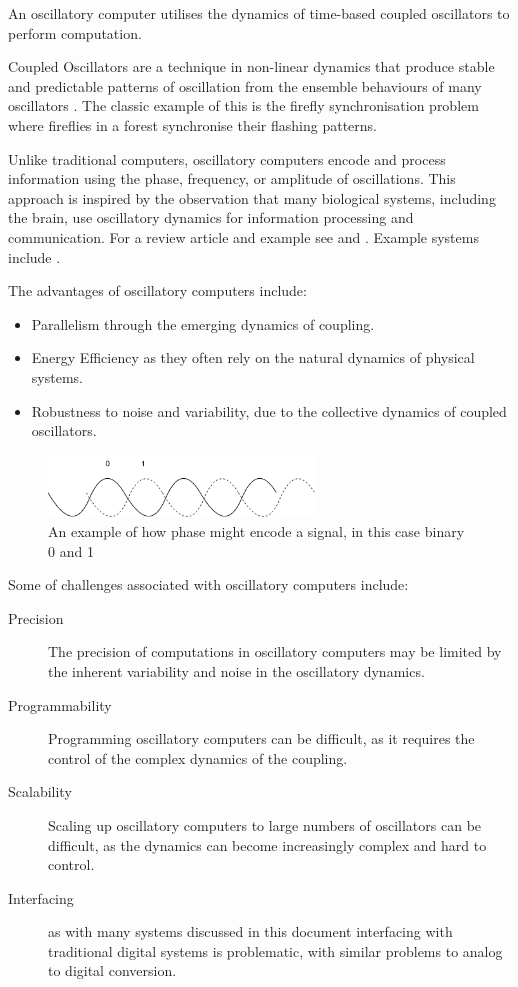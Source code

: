 \documentclass{article}
\begin{document}
An oscillatory computer utilises the dynamics of time-based coupled oscillators to perform computation.

Coupled Oscillators are a technique in non-linear dynamics that produce stable and predictable patterns of oscillation from the ensemble behaviours of many oscillators \cite{strogatz2001nonlinear}. The classic example of this is the firefly synchronisation problem \cite{buck1988synchronous} where fireflies in a forest synchronise their flashing patterns.

Unlike traditional computers, oscillatory computers encode and process information using the phase, frequency, or amplitude of oscillations. This approach is inspired by the observation that many biological systems, including the brain, use oscillatory dynamics for information processing and communication. For a review article and example see \cite{csaba2020coupled} and \cite{csaba2018perspectives}. Example systems include \cite{ring} \cite{delacour2021oscillatory} \cite{delacour2023mixed} \cite{corti2021networks} \cite{frady2019robust} \cite{maher2024highly}.

The advantages of oscillatory computers include:

\begin{itemize}
	\item Parallelism through the emerging dynamics of coupling.
	\item Energy Efficiency as they often rely on the natural dynamics of physical systems.
	\item Robustness to noise and variability, due to the collective dynamics of coupled oscillators.
\end{itemize}

\begin{figure}
	\centerline{\includegraphics[width=200pt]{figures/oscil.png}}
	\caption{An example of how phase might encode a signal, in this case binary 0 and 1}\label{fig:fig2}
\end{figure}

Some of challenges associated with oscillatory computers include:

\begin{description}
	\item[Precision] The precision of computations in oscillatory computers may be limited by the inherent variability and noise in the oscillatory dynamics.
	\item[Programmability] Programming oscillatory computers can be difficult, as it requires the control of the complex dynamics of the coupling.
	\item[Scalability] Scaling up oscillatory computers to large numbers of oscillators can be difficult, as the dynamics can become increasingly complex and hard to control.
	\item[Interfacing] as with many systems discussed in this document interfacing with traditional digital systems is problematic, with similar problems to analog to digital conversion.
\end{description}
\end{document}
